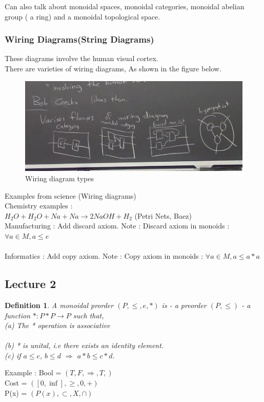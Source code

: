\documentclass{article}
\newtheorem{defn}[thm]{Definition} %
\begin{document}
Can also talk about monoidal spaces, monoidal categories, monoidal abelian group ( a ring) and a monoidal topological space.
\newpage

\subsubsection{Wiring Diagrams(String Diagrams)}
These diagrams involve the human visual cortex. \\
There are varieties of wiring diagrams, As shown in the figure below.

\begin{figure}[h!]
    \centering
    \includegraphics[scale=0.5]{./images/6.jpg}
    \caption{Wiring diagram types}
    \label{fig:my_label}
\end{figure}
Examples from science (Wiring diagrams)
\\
Chemistry examples : \\
$H_2O + H_2O + Na + Na \rightarrow 2NaOH + H_2$
(Petri Nets, Baez) \\
Manufacturing : Add discard axiom. 
Note : Discard axiom in monoids : $\forall a \in M, a \leq e$ \\
\\
Informatics : Add copy axiom. 
Note : Copy axiom in monoids : $\forall a \in M, a \leq a*a$
\\ 
\newpage
\subsection{Lecture 2}
\begin{defn}
    A monoidal prorder $(P, \leq, e, *)$ is
     - a preorder $(P, \leq)$
     - a function $*: P *P \rightarrow P$
     such that, \\
     (a) The * operation is associative \\
     \\(b) * is unital, i.e there exists an identity element. 
     \\(c) if $a \leq c$, $b \leq d$ $\Rightarrow$ $ a*b \leq c*d$.
\end{defn}
Example :
Bool = $({T, F}, \Rightarrow, T, )$ \\
Cost = $([0, \inf], \geq, 0, +)$\\
P(x) = $(P(x), \subset, X, \cap)$\\
\end{document}
